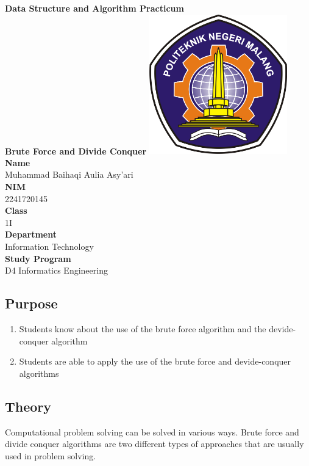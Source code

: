\documentclass[12pt,titlepage]{article}
\newcommand{\vSubject}{Data Structure and Algorithm Practicum}
\newcommand{\vSubtitle}{Brute Force and Divide Conquer}
\newcommand{\vName}{Muhammad Baihaqi Aulia Asy'ari}
\newcommand{\vNIM}{2241720145}
\newcommand{\vClass}{1I}
\newcommand{\vDepartment}{Information Technology}
\newcommand{\vStudyProgram}{D4 Informatics Engineering}
\begin{document}
\begin{titlepage}
    \centering
    \vfill
    {\bfseries\LARGE
        \vSubject\\
        \vskip0.25cm
        \vSubtitle
    }
    \vfill
    \includegraphics[width=6cm]{images/polinema-logo.png}
    \vfill
    {
        \textbf{Name}\\
        \vName\\
        \vskip0.5cm
        \textbf{NIM}\\
        \vNIM\\
        \vskip0.5cm
        \textbf{Class}\\
        \vClass\\
        \vskip0.5cm
        \textbf{Department}\\
        \vDepartment\\
        \vskip0.5cm
        \textbf{Study Program}\\
        \vStudyProgram
    }
\end{titlepage}

\newpage

\setcounter{section}{2}

\subsection{Purpose}

\begin{enumerate}
    \item Students know about the use of the brute force algorithm and the devide-conquer algorithm
    \item Students are able to apply the use of the brute force and devide-conquer algorithms
\end{enumerate}

\subsection{Theory}
Computational problem solving can be solved in various ways. Brute force and divide conquer algorithms are two different types of approaches that are usually used in problem solving.
\end{document}
